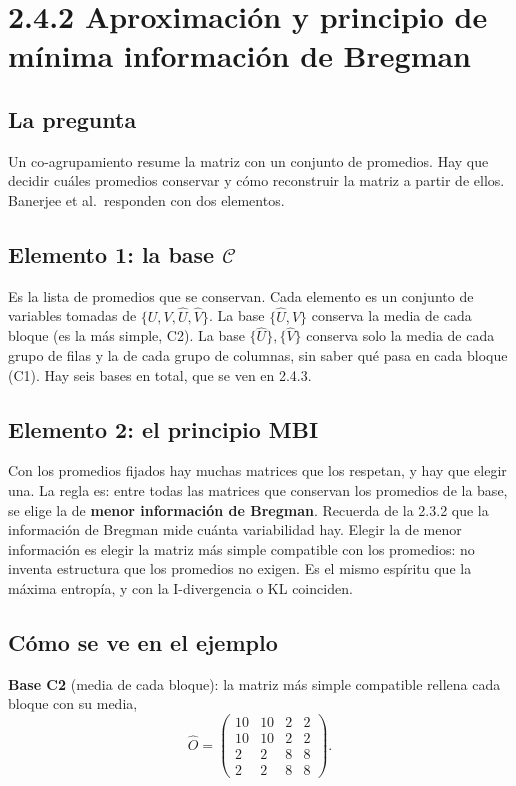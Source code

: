 \documentclass[11pt,a4paper]{article}
\begin{document}
\section{2.4.2 Aproximación y principio de mínima información de Bregman}

\subsection{La pregunta}

Un co-agrupamiento resume la matriz con un conjunto de promedios. Hay que decidir
cuáles promedios conservar y cómo reconstruir la matriz a partir de ellos. Banerjee
et al.\ responden con dos elementos.

\subsection{Elemento 1: la base $\mathcal C$}

Es la lista de promedios que se conservan. Cada elemento es un conjunto de
variables tomadas de $\{U,V,\hat U,\hat V\}$. La base $\{\hat U,\hat V\}$ conserva
la media de cada bloque (es la más simple, C2). La base $\{\hat U\},\{\hat V\}$
conserva solo la media de cada grupo de filas y la de cada grupo de columnas, sin
saber qué pasa en cada bloque (C1). Hay seis bases en total, que se ven en 2.4.3.

\subsection{Elemento 2: el principio MBI}

Con los promedios fijados hay muchas matrices que los respetan, y hay que elegir
una. La regla es: entre todas las matrices que conservan los promedios de la base,
se elige la de \textbf{menor información de Bregman}. Recuerda de la 2.3.2 que la
información de Bregman mide cuánta variabilidad hay. Elegir la de menor
información es elegir la matriz más simple compatible con los promedios: no
inventa estructura que los promedios no exigen. Es el mismo espíritu que la máxima
entropía, y con la I-divergencia o KL coinciden.

\subsection{Cómo se ve en el ejemplo}

\textbf{Base C2} (media de cada bloque): la matriz más simple compatible rellena
cada bloque con su media,
\[
  \hat O=\begin{pmatrix}
    10 & 10 & 2 & 2\\
    10 & 10 & 2 & 2\\
    2 & 2 & 8 & 8\\
    2 & 2 & 8 & 8
  \end{pmatrix}.
\]
\end{document}
